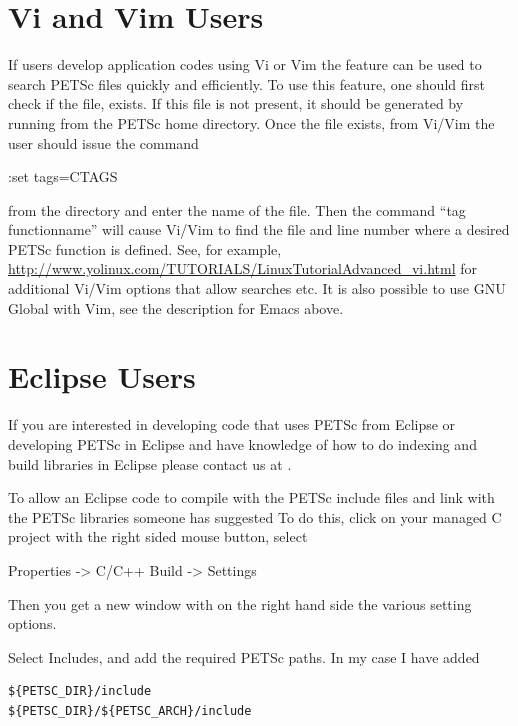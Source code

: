 {{{\section{Vi and Vim Users}   

If users develop application codes  using Vi or Vim the  feature can be used to search PETSc
files quickly and efficiently.  To use this feature, one should
first check if the file,
 exists.  If this file is
not present, it should be generated by
running   from the PETSc home directory.
Once the file exists, from
Vi/Vim the user should issue
the command
\begin{tabbing}
:set tags=CTAGS
\end{tabbing}
from the  directory and enter the
name of the  file. Then the command ``tag functionname'' will cause Vi/Vim
to find the file and line number where a desired PETSc function
is defined.  See, for example, \href{http://www.yolinux.com/TUTORIALS/LinuxTutorialAdvanced_vi.html}{http://www.yolinux.com/TUTORIALS/LinuxTutorialAdvanced\_vi.html} for additional Vi/Vim options that allow searches etc.
It is also possible to use GNU Global with Vim, see the description for Emacs above.

\section{Eclipse Users} 

If you are interested in developing code that uses PETSc from Eclipse or developing PETSc in Eclipse and have knowledge of how to do indexing and build libraries in Eclipse please contact us at .

To allow an Eclipse code to compile with the PETSc include files and link with the PETSc libraries someone has suggested
To do this, click on your managed C project with the right sided mouse button, select

Properties -> C/C++ Build -> Settings

Then you get a new window with on the right hand side the various setting options.

Select Includes, and add the required PETSc paths. In my case I have added
\begin{verbatim}
${PETSC_DIR}/include
${PETSC_DIR}/${PETSC_ARCH}/include
\end{verbatim}

}}}
